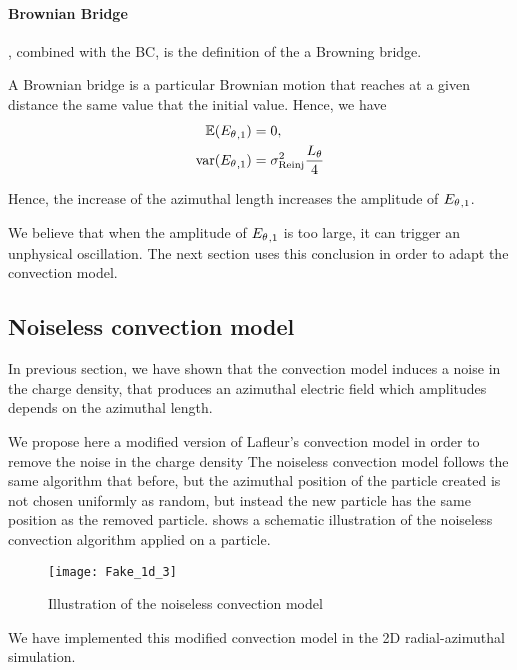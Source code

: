     \paragraph{Brownian Bridge\\}
      , combined with the \ac{BC}, is the definition of the a Browning bridge.
      
      A Brownian bridge is a particular Brownian motion that reaches at a given distance the same value that the initial value.
      Hence, we have \citep{ibe2013}
      \begin{align*}
        \mathbb{E}({E_{\theta}}_{, 1}) &= 0,  \\
        {\rm var}({E_{\theta}}_{, 1}) &= \sigma_{\rm Reinj}^2 \frac{L_{\theta}}{4}
      \end{align*}
    
      Hence, the increase of the azimuthal length increases the amplitude of ${E_{\theta}}_{, 1}$.
      
    
    We believe that when the amplitude of ${E_{\theta}}_{, 1}$ is too large, it can trigger an unphysical oscillation.
    The next section uses this conclusion in order to adapt the convection model.
    
    \subsection{Noiseless convection model}
      \label{sec-noiselessresults}
      In previous section, we have shown that the convection model induces a noise in the charge density, that produces an azimuthal electric field which amplitudes depends on the azimuthal length.
      
      We propose here a modified version of Lafleur's convection model in order to remove the noise in the charge density
      The noiseless convection model follows the same algorithm that before, but the azimuthal position of the particle created is not chosen uniformly as random, but instead the new particle has the same position as the removed particle.
       shows a schematic illustration of the noiseless convection algorithm applied on a particle.
      
      \begin{figure}[hbtp]
        \centering
        \texttt{[image: Fake\_1d\_3]}
        \caption{Illustration of the noiseless convection model}
        \label{fig-fakez3}
      \end{figure}
      
      We have implemented this modified convection model in the \ac{2D} radial-azimuthal simulation.
      
